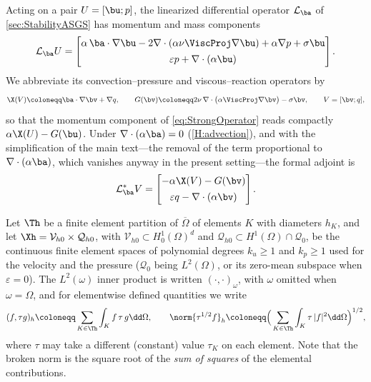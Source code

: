 Acting on a pair $U=[\bu;p]$, the linearized differential operator $\mathcal{L}_{\ba}$ of
\cref{sec:StabilityASGS} has momentum and mass components
\begin{equation}\label{eq:StrongOperator}
  \mathcal{L}_{\ba}U =
  \begin{bmatrix}
    \alpha\,\ba\cdot\nabla\bu - 2\nabla\cdot(\alpha\nu\ViscProj\nabla\bu) + \alpha\nabla p + \sigma\bu\\[4pt]
    \varepsilon p + \nabla\cdot(\alpha\bu)
  \end{bmatrix}.
\end{equation}
We abbreviate its convection--pressure and viscous--reaction operators by
\begin{equation}\label{eq:XG}
  \X(V) \coloneqq \ba\cdot\nabla\bv + \nabla q,
  \qquad
  G(\bv) \coloneqq 2\nu\,\nabla\cdot\bigl(\alpha\ViscProj\nabla\bv\bigr) - \sigma\bv,
  \qquad V=[\bv;q],
\end{equation}
so that the momentum component of \cref{eq:StrongOperator} reads compactly $\alpha\X(U)-G(\bu)$.
Under $\nabla\cdot(\alpha\ba)=0$ (\cref{H:advection}), and with the simplification of the main
text---the removal of the term proportional to $\nabla\cdot(\alpha\ba)$, which vanishes anyway
in the present setting---the formal adjoint is
\begin{equation}\label{eq:AdjointOperator}
  \mathcal{L}_{\ba}^{*}V =
  \begin{bmatrix}
    -\alpha\X(V)-G(\bv)\\[4pt]
    \varepsilon q - \nabla\cdot(\alpha\bv)
  \end{bmatrix}.
\end{equation}

Let $\Th$ be a finite element partition of $\overline{\Omega}$ of elements $K$ with
diameters $h_K$, and let
$\Xh = \mathcal{V}_{h0}\times\mathcal{Q}_{h0}$, with
$\mathcal{V}_{h0}\subset H_0^1(\Omega)^d$ and
$\mathcal{Q}_{h0}\subset H^1(\Omega)\cap\mathcal{Q}_0$, be the continuous finite element
spaces of polynomial degrees $k_u\ge 1$ and $k_p\ge 1$ used for the velocity and the
pressure ($\mathcal{Q}_0$ being $L^2(\Omega)$, or its zero-mean subspace when
$\varepsilon=0$). The $L^2(\omega)$ inner product is written
$(\cdot,\cdot)_\omega$, with $\omega$ omitted when $\omega=\Omega$, and for elementwise
defined quantities we write
\begin{equation}\label{eq:brokennotation}
  (f,\tau g)_h \coloneqq \sum_{K\in\Th}\int_K f\,\tau\, g \dd\Omega,
  \qquad
  \norm{\tau^{1/2} f}_h \coloneqq \Bigl(\,\sum_{K\in\Th}\int_K \tau\, |f|^2
  \dd\Omega\Bigr)^{1/2},
\end{equation}
where $\tau$ may take a different (constant) value $\tau_K$ on each element. Note that the
broken norm is the square root of the \emph{sum of squares} of the elemental contributions.


